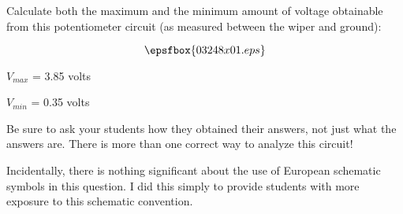 

Calculate both the maximum and the minimum amount of voltage obtainable from this potentiometer circuit (as measured between the wiper and ground):

$$\epsfbox{03248x01.eps}$$







$V_{max}$ = 3.85 volts

\vskip 10pt

$V_{min}$ = 0.35 volts







Be sure to ask your students how they obtained their answers, not just what the answers are.  There is more than one correct way to analyze this circuit!

Incidentally, there is nothing significant about the use of European schematic symbols in this question.  I did this simply to provide students with more exposure to this schematic convention.




